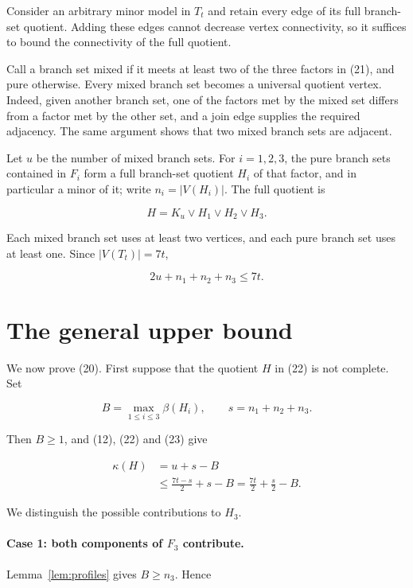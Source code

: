 \documentclass[11pt]{article}
\begin{document}
Consider an arbitrary minor model in $T_t$ and retain every edge of its full
branch-set quotient. Adding these edges cannot decrease vertex connectivity,
so it suffices to bound the connectivity of the full quotient.

Call a branch set mixed if it meets at least two of the three factors in (21),
and pure otherwise. Every mixed branch set becomes a universal quotient
vertex. Indeed, given another branch set, one of the factors met by the mixed
set differs from a factor met by the other set, and a join edge supplies the
required adjacency. The same argument shows that two mixed branch sets are
adjacent.

Let $u$ be the number of mixed branch sets. For $i=1,2,3$, the pure branch sets
contained in $F_i$ form a full branch-set quotient $H_i$ of that factor, and in
particular a minor of it; write $n_i=|V(H_i)|$. The full quotient is

\nopagebreak[4]
\[
H=K_u\vee H_1\vee H_2\vee H_3.                             \tag{22}
\]

Each mixed branch set uses at least two vertices, and each pure branch set uses
at least one. Since $|V(T_t)|=7t$,

\nopagebreak[4]
\[
2u+n_1+n_2+n_3\leq7t.                                     \tag{23}
\]

\section{The general upper bound}


We now prove (20). First suppose that the quotient $H$ in (22) is not complete.
Set

\nopagebreak[4]
\[
B=\max_{1\leq i\leq3}\beta(H_i),
\qquad
s=n_1+n_2+n_3.
\]

Then $B\geq1$, and (12), (22) and (23) give

\nopagebreak[4]
\[
\begin{aligned}
\kappa(H)
&=u+s-B\\
&\leq\frac{7t-s}{2}+s-B
=\frac{7t}{2}+\frac{s}{2}-B.
\end{aligned}
\tag{24}
\]

We distinguish the possible contributions to $H_3$.

\paragraph{Case 1: both components of $F_3$ contribute.}


Lemma~\ref{lem:profiles} gives $B\geq n_3$. Hence
\end{document}
